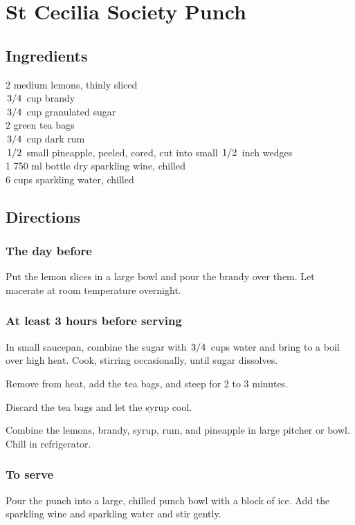 \documentclass{article}
\newcounter{qcounter}
\begin{document}
\newcommand{\slfrac}[2]{\left.#1\middle/#2\right.}

\section*{St Cecilia Society Punch}



\subsection*{Ingredients}
2 medium lemons, thinly sliced\\
$\slfrac{3}{4}$ cup brandy\\
$\slfrac{3}{4}$ cup granulated sugar\\
2 green tea bags\\
$\slfrac{3}{4}$ cup dark rum\\
$\slfrac{1}{2}$ small pineapple, peeled, cored, cut into small $\slfrac{1}{2}$ inch wedges\\
1 750 ml bottle dry sparkling wine, chilled\\
6 cups sparkling water, chilled\\

\subsection*{Directions}
\subsubsection*{The day before}
Put the lemon slices in a large bowl and pour the brandy over them. Let macerate at room temperature overnight.

\subsubsection*{At least 3 hours before serving}

\begin{list}{:~}{}
\item In small saucepan, combine the sugar with $\slfrac{3}{4}$ cups water and bring to a boil over high heat.  Cook, 
stirring occasionally, until sugar dissolves.
\item Remove from heat, add the tea bags, and steep for 2 to 3 minutes.
\item Discard the tea bags and let the syrup cool.
\item Combine the lemons, brandy, syrup, rum, and pineapple in large pitcher or bowl. Chill in refrigerator. 
\end{list}

\subsubsection*{To serve}
Pour the punch into a large, chilled punch bowl with a block of ice.  Add the sparkling wine and sparkling water and stir gently.
\end{document}
